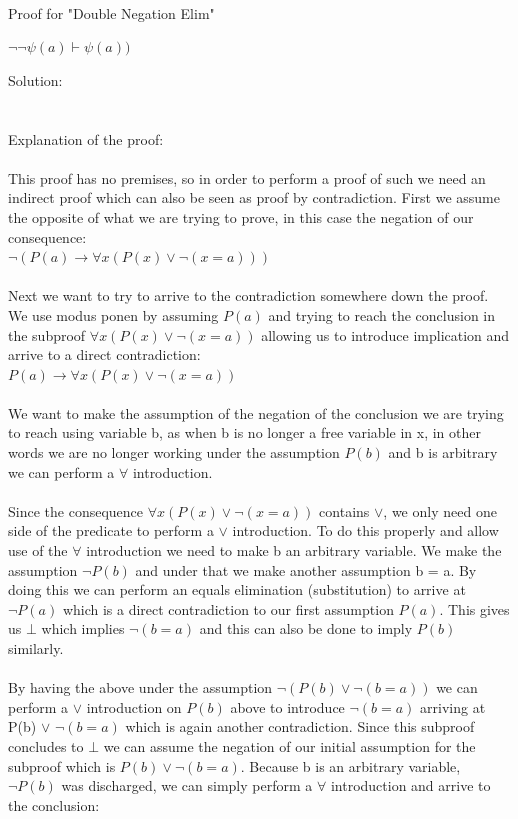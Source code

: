 \documentclass{article}
\newcommand*\fixindent{ \hspace{1pt}\\}
\begin{document}
\newpage
\fixindent{}
Proof for "Double Negation Elim"\\
\begin{center}
$\neg\neg \psi(a)\vdash \psi(a))$    
\end{center}
Solution:\\
 \\\\
Explanation of the proof:\\
\fixindent{}
This proof has no premises, so in order to perform a proof of such we need an indirect proof which can also be seen as proof by contradiction. First we assume the opposite of what we are trying to prove, in this case the negation of our consequence:
\fixindent{}
\hspace*{150pt}$\neg(P(a) \to \forall x(P(x) \lor \neg(x = a)))$\\\fixindent{}
Next we want to try to arrive to the contradiction somewhere down the proof. We use modus ponen by assuming $P(a)$ and trying to reach the conclusion in the subproof $\forall x(P(x) \lor \neg(x = a))$ allowing us to introduce implication and arrive to a direct contradiction:
\fixindent{}
\hspace*{150pt}$P(a) \to \forall x(P(x) \lor \neg(x = a))$
\fixindent{}\fixindent{}
We want to make the assumption of the negation of the conclusion we are trying to reach using variable b, as when b is no longer a free variable in x, in other words we are no longer working under the assumption $P(b)$ and b is arbitrary we can perform a $\forall$ introduction.\\
\fixindent{}
Since the consequence $\forall x(P(x) \lor \neg(x = a))$ contains $\lor$, we only need one side of the predicate to perform a $\lor$ introduction. To do this properly and allow use of the $\forall$ introduction we need to make b an arbitrary variable. We make the assumption $\neg P(b)$ and under that we make another assumption b = a. By doing this we can perform an equals elimination (substitution) to arrive at $\neg P(a)$ which is a direct contradiction to our first assumption $P(a)$. This gives us $\bot$ which implies $\neg (b = a)$ and this can also be done to imply $P(b)$ similarly.\\
\fixindent{}
By having the above under the assumption $\neg(P(b) \lor \neg(b = a))$ we can perform a $\lor$ introduction on $P(b)$ above to introduce $\neg(b = a)$ arriving at P(b) $\lor$ $\neg(b = a)$ which is again another contradiction. Since this subproof concludes to $\bot$ we can assume the negation of our initial assumption for the subproof which is $P(b) \lor \neg(b = a)$. Because b is an arbitrary variable, $\neg P(b)$ was discharged, we can simply perform a $\forall$ introduction and arrive to the conclusion:\\
\end{document}
